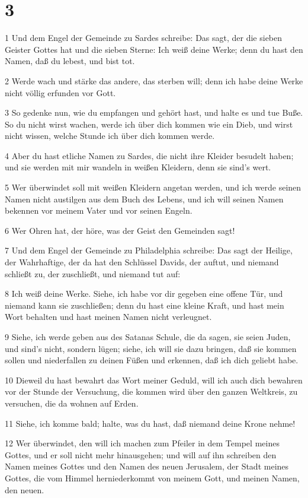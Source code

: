 \chapter{3}

\par 1 Und dem Engel der Gemeinde zu Sardes schreibe: Das sagt, der die sieben Geister Gottes hat und die sieben Sterne: Ich weiß deine Werke; denn du hast den Namen, daß du lebest, und bist tot.
\par 2 Werde wach und stärke das andere, das sterben will; denn ich habe deine Werke nicht völlig erfunden vor Gott.
\par 3 So gedenke nun, wie du empfangen und gehört hast, und halte es und tue Buße. So du nicht wirst wachen, werde ich über dich kommen wie ein Dieb, und wirst nicht wissen, welche Stunde ich über dich kommen werde.
\par 4 Aber du hast etliche Namen zu Sardes, die nicht ihre Kleider besudelt haben; und sie werden mit mir wandeln in weißen Kleidern, denn sie sind's wert.
\par 5 Wer überwindet soll mit weißen Kleidern angetan werden, und ich werde seinen Namen nicht austilgen aus dem Buch des Lebens, und ich will seinen Namen bekennen vor meinem Vater und vor seinen Engeln.
\par 6 Wer Ohren hat, der höre, was der Geist den Gemeinden sagt!
\par 7 Und dem Engel der Gemeinde zu Philadelphia schreibe: Das sagt der Heilige, der Wahrhaftige, der da hat den Schlüssel Davids, der auftut, und niemand schließt zu, der zuschließt, und niemand tut auf:
\par 8 Ich weiß deine Werke. Siehe, ich habe vor dir gegeben eine offene Tür, und niemand kann sie zuschließen; denn du hast eine kleine Kraft, und hast mein Wort behalten und hast meinen Namen nicht verleugnet.
\par 9 Siehe, ich werde geben aus des Satanas Schule, die da sagen, sie seien Juden, und sind's nicht, sondern lügen; siehe, ich will sie dazu bringen, daß sie kommen sollen und niederfallen zu deinen Füßen und erkennen, daß ich dich geliebt habe.
\par 10 Dieweil du hast bewahrt das Wort meiner Geduld, will ich auch dich bewahren vor der Stunde der Versuchung, die kommen wird über den ganzen Weltkreis, zu versuchen, die da wohnen auf Erden.
\par 11 Siehe, ich komme bald; halte, was du hast, daß niemand deine Krone nehme!
\par 12 Wer überwindet, den will ich machen zum Pfeiler in dem Tempel meines Gottes, und er soll nicht mehr hinausgehen; und will auf ihn schreiben den Namen meines Gottes und den Namen des neuen Jerusalem, der Stadt meines Gottes, die vom Himmel herniederkommt von meinem Gott, und meinen Namen, den neuen.
